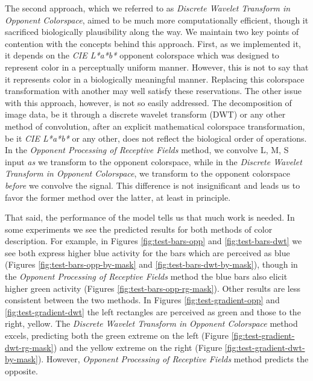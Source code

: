 \documentclass[journal,onecolumn]{IEEEtran}
\begin{document}
The second approach, which we referred to as \textit{Discrete Wavelet Transform in Opponent Colorspace}, aimed to be much more computationally efficient, though it sacrificed biologically plausibility along the way. We maintain two key points of contention with the concepts behind this approach. First, as we implemented it, it depends on the \textit{CIE L*a*b*} opponent colorspace which was designed to represent color in a perceptually uniform manner. However, this is not to say that it represents color in a biologically meaningful manner. Replacing this colorspace transformation with another may well satisfy these reservations. The other issue with this approach, however, is not so easily addressed. The decomposition of image data, be it through a discrete wavelet transform (DWT) or any other method of convolution, after an explicit mathematical colorspace transformation, be it \textit{CIE L*a*b*} or any other, does not reflect the biological order of operations. In the \textit{Opponent Processing of Receptive Fields} method, we convolve L, M, S input \textit{as} we transform to the opponent colorspace, while in the \textit{Discrete Wavelet Transform in Opponent Colorspace}, we transform to the opponent colorspace \textit{before} we convolve the signal. This difference is not insignificant and leads us to favor the former method over the latter, at least in principle.

That said, the performance of the model tells us that much work is needed. In some experiments we see the predicted results for both methods of color description. For example, in Figures \ref{fig:test-bars-opp} and \ref{fig:test-bars-dwt} we see both express higher blue activity for the bars which are perceived as blue (Figures \ref{fig:test-bars-opp-by-mask} and \ref{fig:test-bars-dwt-by-mask}), though in the \textit{Opponent Processing of Receptive Fields} method the blue bars also elicit higher green activity (Figures \ref{fig:test-bars-opp-rg-mask}). Other results are less consistent between the two methods. In Figures \ref{fig:test-gradient-opp} and \ref{fig:test-gradient-dwt} the left rectangles are perceived as green and those to the right, yellow. The \textit{Discrete Wavelet Transform in Opponent Colorspace} method excels, predicting both the green extreme on the left (Figure \ref{fig:test-gradient-dwt-rg-mask}) and the yellow extreme on the right (Figure \ref{fig:test-gradient-dwt-by-mask}). However, \textit{Opponent Processing of Receptive Fields} method predicts the opposite.

\newpage
\end{document}

